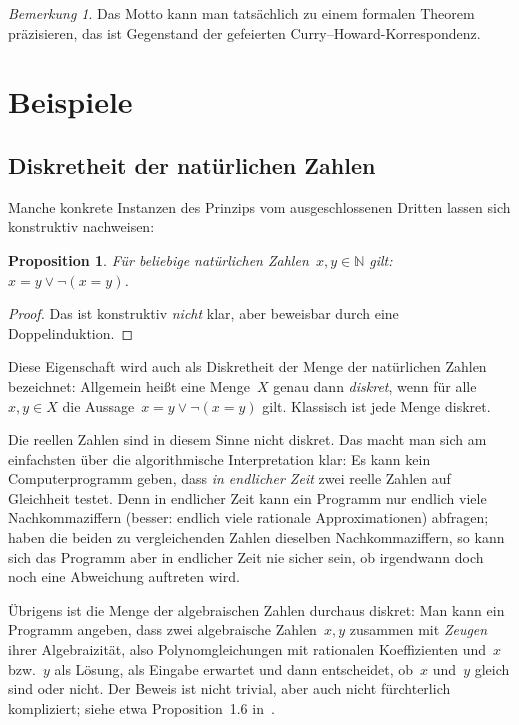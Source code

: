 \documentclass[a4paper,ngerman,12pt]{scrartcl}
\theoremstyle{definition}
\theoremstyle{plain}
\newtheorem{prop}[defn]{Proposition}
\theoremstyle{remark}
\newtheorem{bem}[defn]{Bemerkung}
\newcommand{\NN}{\mathbb{N}}
\renewcommand{\_}{\mathpunct{.}\,}
\newcommand{\?}{\,{:}\,}
\begin{document}
\begin{bem}Das Motto kann man tatsächlich zu einem formalen Theorem
präzisieren, das ist Gegenstand der gefeierten
Curry--Howard-Korrespondenz.\end{bem}


\section{Beispiele}

\subsection{Diskretheit der natürlichen Zahlen}

Manche konkrete Instanzen des Prinzips vom ausgeschlossenen Dritten lassen sich
konstruktiv nachweisen:

\begin{prop}\label{natdiskret}Für beliebige natürlichen Zahlen~$x,y \in \NN$
gilt: $x = y \vee \neg(x = y)$.\end{prop}
\begin{proof}Das ist konstruktiv \emph{nicht} klar, aber beweisbar durch eine
Doppelinduktion.\end{proof}

Diese Eigenschaft wird auch als Diskretheit der Menge der natürlichen Zahlen
bezeichnet: Allgemein heißt eine Menge~$X$ genau dann \emph{diskret}, wenn für
alle~$x,y \in X$ die Aussage~$x = y \vee \neg(x = y)$ gilt. Klassisch ist jede
Menge diskret.

Die reellen Zahlen sind in diesem Sinne nicht diskret. Das macht
man sich am einfachsten über die algorithmische Interpretation klar: Es kann
kein Computerprogramm geben, dass \emph{in endlicher Zeit} zwei reelle Zahlen
auf Gleichheit testet. Denn in endlicher Zeit kann ein Programm nur endlich viele
Nachkommaziffern (besser: endlich viele rationale Approximationen) abfragen;
haben die beiden zu vergleichenden Zahlen dieselben Nachkommaziffern, so kann
sich das Programm aber in endlicher Zeit nie sicher sein, ob irgendwann doch noch
eine Abweichung auftreten wird.

Übrigens ist die Menge der algebraischen Zahlen durchaus diskret:
Man kann ein
Programm angeben, dass zwei algebraische Zahlen~$x,y$ zusammen mit \emph{Zeugen}
ihrer Algebraizität, also Polynomgleichungen mit rationalen Koeffizienten
und~$x$ bzw.~$y$ als Lösung, als Eingabe erwartet und dann entscheidet, ob~$x$
und~$y$ gleich sind oder nicht. Der Beweis ist nicht trivial, aber auch nicht
fürchterlich kompliziert; siehe etwa Proposition~1.6 in~\cite{nw:algebra}.
\end{document}
